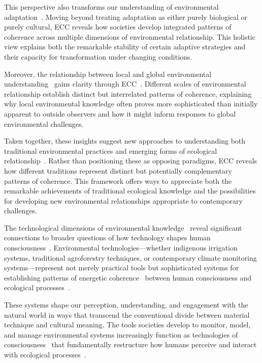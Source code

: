 This perspective also transforms our understanding of environmental adaptation~\cite{strathern1980nature,strathern2004partial}. Moving beyond treating adaptation as either purely biological or purely cultural, ECC reveals how societies develop integrated patterns of coherence across multiple dimensions of environmental relationship. This holistic view explains both the remarkable stability of certain adaptive strategies and their capacity for transformation under changing conditions.

Moreover, the relationship between local and global environmental understanding~ gains clarity through ECC~\cite{tsing2015mushroom,latour2005reassembling}. Different scales of environmental relationship establish distinct but interrelated patterns of coherence, explaining why local environmental knowledge often proves more sophisticated than initially apparent to outside observers and how it might inform responses to global environmental challenges.

Taken together, these insights suggest new approaches to understanding both traditional environmental practices and emerging forms of ecological relationship~\cite{latour2004politics,wolf1999envisioning}. Rather than positioning these as opposing paradigms, ECC reveals how different traditions represent distinct but potentially complementary patterns of coherence. This framework offers ways to appreciate both the remarkable achievements of traditional ecological knowledge and the possibilities for developing new environmental relationships appropriate to contemporary challenges.

The technological dimensions of environmental knowledge~ reveal significant connections to broader questions of how technology shapes human consciousness~\cite{ingold2000perception,hayles2012how}. Environmental technologies—whether indigenous irrigation systems, traditional agroforestry techniques, or contemporary climate monitoring systems—represent not merely practical tools but sophisticated systems for establishing patterns of energetic coherence~ between human consciousness and ecological processes~\cite{latour2004politics,clark2003natural}.

These systems shape our perception, understanding, and engagement with the natural world in ways that transcend the conventional divide between material technique and cultural meaning. The tools societies develop to monitor, model, and manage environmental systems increasingly function as technologies of consciousness~ that fundamentally restructure how humans perceive and interact with ecological processes~\cite{haraway2016staying,tsing2015mushroom}.

